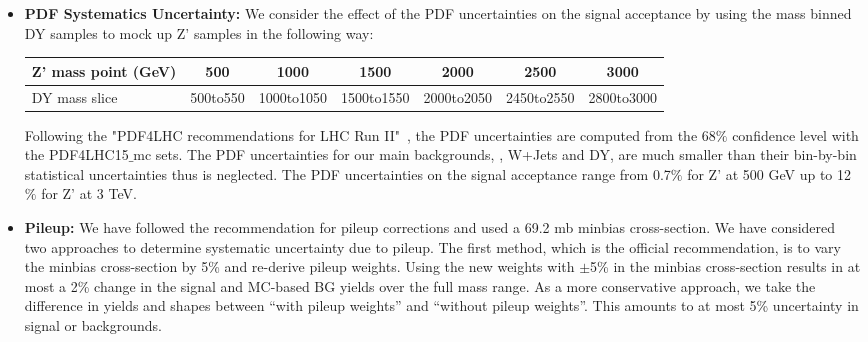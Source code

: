 \begin{itemize}
  \item \textbf{PDF Systematics Uncertainty:} We consider the effect of the PDF uncertainties on the signal acceptance 
by using the mass binned DY samples to mock up Z' samples in the following way:
\begin{table}[ht]	
  \begin{tabular}{| l | c | c | c | c | c | c |} 
  \hline\hline 
  Z' mass point (GeV) & 500 & 1000 & 1500 & 2000 & 2500 & 3000\\
  \hline
  DY mass slice & 500to550 & 1000to1050 & 1500to1550 & 2000to2050 & 2450to2550 & 2800to3000\\
  \hline \hline
  \end{tabular}
\end{table}

Following the "PDF4LHC recommendations for LHC Run
II"~\cite{PDF4LHC15}, the PDF uncertainties are computed from the
68$\%$ confidence level with the PDF4LHC15$\_$mc sets. The PDF 
uncertainties for our main backgrounds, \ttbar, W+Jets and DY, are
much smaller than their bin-by-bin statistical uncertainties thus is
neglected. The PDF uncertainties on the signal acceptance range from
0.7$\%$ for Z' at 500 GeV up to 12$\%$ for Z' at 3 TeV.

  \item \textbf{Pileup:} We have followed the recommendation for pileup corrections and used a 69.2 mb minbias cross-section. We have considered two approaches to 
determine systematic uncertainty due to pileup. The first method, which is the official recommendation, is to vary the minbias cross-section by 5\% and re-derive pileup 
weights. Using the new weights with $\pm$5\% in the minbias cross-section results in at most a 2\% change in the signal and MC-based BG yields over the full mass range. 
As a more conservative approach, we take the difference in yields and shapes between ``with pileup weights'' and ``without pileup weights''. This amounts to at most 5\% 
uncertainty in signal or backgrounds. 


\end{itemize}
